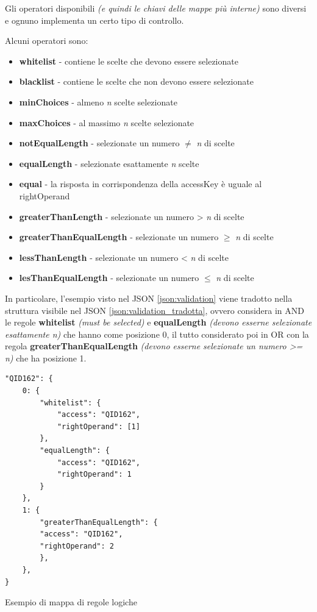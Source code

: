Gli operatori disponibili \textit{(e quindi le chiavi delle mappe più interne)} sono diversi e ognuno implementa un certo tipo di controllo. 

Alcuni operatori sono:
\begin{itemize}
\item \textbf{whitelist} - contiene le scelte che devono essere selezionate
\item \textbf{blacklist} - contiene le scelte che non devono essere selezionate
\item \textbf{minChoices} - almeno \textit{n} scelte selezionate
\item \textbf{maxChoices} - al massimo \textit{n} scelte selezionate
\item \textbf{notEqualLength} - selezionate un numero $\neq$ \textit{n} di scelte
\item \textbf{equalLength} - selezionate esattamente \textit{n} scelte
\item \textbf{equal} - la risposta in corrispondenza della accessKey è uguale al rightOperand
\item \textbf{greaterThanLength} - selezionate un numero > \textit{n} di scelte
\item \textbf{greaterThanEqualLength} - selezionate un numero $\geq$ \textit{n} di scelte
\item \textbf{lessThanLength} - selezionate un numero < \textit{n} di scelte
\item \textbf{lesThanEqualLength} - selezionate un numero $\leq$ \textit{n} di scelte
\end{itemize}

In particolare, l'esempio visto nel JSON \ref{json:validation} viene tradotto nella struttura visibile nel JSON \ref{json:validation_tradotta}, ovvero considera in AND le regole \textbf{whitelist} \textit{(must be selected)} e \textbf{equalLength} \textit{(devono esserne selezionate esattamente n)} che hanno come posizione 0, il tutto considerato poi in OR con la regola \textbf{greaterThanEqualLength} \textit{(devono esserne selezionate un numero >= n)} che ha posizione 1.

\begin{json}
\begin{verbatim}
"QID162": {
    0: {
        "whitelist": {
            "access": "QID162",
            "rightOperand": [1]
        },
        "equalLength": {
            "access": "QID162",
            "rightOperand": 1
        }
    },
    1: {
        "greaterThanEqualLength": {
        "access": "QID162",
        "rightOperand": 2
        },
    },
}
\end{verbatim}
\caption{Esempio di mappa di regole logiche}
\label{json:validation_tradotta}
\end{json}

